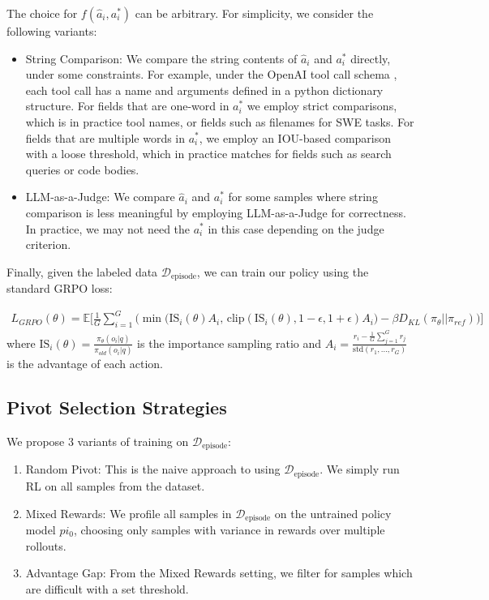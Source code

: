 The choice for $f(\hat{a}_i, a_i^*)$ can be arbitrary. For simplicity, we consider the following variants:
\begin{itemize}
    \item String Comparison: We compare the string contents of $\hat{a}_i$ and $a_i^*$ directly, under some constraints. For example, under the OpenAI tool call schema \citep{OpenAI_Function_Calling} , each tool call has a name and arguments defined in a python dictionary structure. For fields that are one-word in $a_i^*$ we employ strict comparisons, which is in practice tool names, or fields such as filenames for SWE tasks. For fields that are multiple words in $a_i^*$, we employ an IOU-based comparison with a loose threshold, which in practice matches for fields such as search queries or code bodies.
    \item LLM-as-a-Judge: We compare $\hat{a}_i$ and $a_i^*$ for some samples where string comparison is less meaningful by employing LLM-as-a-Judge for correctness. In practice, we may not need the $a_i^*$ in this case depending on the judge criterion.
\end{itemize}

Finally, given the labeled data $\mathcal{D}_{\text{episode}}$, we can train our policy using the standard GRPO \citep{shao2024deepseekmath} loss:

\begin{align}
L_{GRPO}(\theta) = \mathbb{E} \Bigg[ \frac{1}{G} \sum_{i=1}^G \bigg( \min \Big( \text{IS}_i(\theta) A_i, \, \text{clip}(\text{IS}_i(\theta), 1-\epsilon, 1+\epsilon) A_i \Big) - \beta D_{KL}(\pi_\theta || \pi_{ref}) \bigg) \Bigg]
\end{align}
where $\text{IS}_i(\theta) = \frac{\pi_\theta(o_i | q)}{\pi_{old}(o_i | q)}$ is the importance sampling ratio and $A_i = \frac{r_i - \frac{1}{G} \sum_{j=1}^G r_j}{\text{std}(r_1, \dots, r_G)}$ is the advantage of each action.


\subsection{Pivot Selection Strategies}
We propose 3 variants of training on $\mathcal{D}_{\text{episode}}$:
\begin{enumerate}
    \item Random Pivot: This is the naive approach to using $\mathcal{D}_{\text{episode}}$. We simply run RL on all samples from the dataset.
    \item Mixed Rewards: We profile all samples in $\mathcal{D}_{\text{episode}}$ on the untrained policy model $pi_0$, choosing only samples with variance in rewards over multiple rollouts.
    \item Advantage Gap: From the Mixed Rewards setting, we filter for samples which are difficult with a set threshold.
\end{enumerate}

